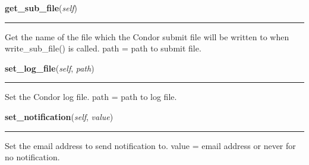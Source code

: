     \label{pipeline:CondorJob:get_sub_file}
    \vspace{0.5ex}

    \noindent\begin{boxedminipage}{\textwidth}

    \raggedright \textbf{get\_sub\_file}(\textit{self})

    \vspace{-1.5ex}

    \rule{\textwidth}{0.5\fboxrule}
    Get the name of the file which the Condor submit file will be written 
    to when write\_sub\_file() is called. path = path to submit file.

    \vspace{1ex}

    \end{boxedminipage}

    \label{pipeline:CondorJob:set_log_file}
    \vspace{0.5ex}

    \noindent\begin{boxedminipage}{\textwidth}

    \raggedright \textbf{set\_log\_file}(\textit{self}, \textit{path})

    \vspace{-1.5ex}

    \rule{\textwidth}{0.5\fboxrule}
    Set the Condor log file. path = path to log file.

    \vspace{1ex}

    \end{boxedminipage}

    \label{pipeline:CondorJob:set_notification}
    \vspace{0.5ex}

    \noindent\begin{boxedminipage}{\textwidth}

    \raggedright \textbf{set\_notification}(\textit{self}, \textit{value})

    \vspace{-1.5ex}

    \rule{\textwidth}{0.5\fboxrule}
    Set the email address to send notification to. value = email address 
    or never for no notification.

    \vspace{1ex}

    \end{boxedminipage}


